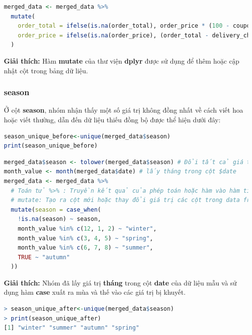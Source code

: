 \begin{lstlisting}[language=R, caption=Xử lý cột \textbf{order\_total} và \textbf{order\_price}]
merged_data <- merged_data %>%
  mutate(
    order_total = ifelse(is.na(order_total), order_price * (100 - coupon_discount) / 100 + delivery_charges, order_total),
    order_price = ifelse(is.na(order_price), (order_total - delivery_charges) * 100 / (100 - coupon_discount), order_price)
  )

\end{lstlisting}
\textbf{Giải thích:} Hàm \textbf{mutate} của thư viện \textbf{dplyr} được sử dụng để thêm hoặc cập nhật cột trong bảng dữ liệu.

\subsubsection{season}

Ở cột \textbf{season}, nhóm nhận thấy một số giá trị không đồng nhất về cách viết hoa hoặc viết thường, dẫn đến dữ liệu thiếu đồng bộ được thể hiện dưới đây:

\begin{lstlisting}[language=R, caption=Giá trị cột \textbf{season} ban đầu]
season_unique_before<-unique(merged_data$season)
print(season_unique_before)

\end{lstlisting}

\begin{lstlisting}[language=R, caption=Xử lý cột \textbf{season}]
merged_data$season <- tolower(merged_data$season) # Đổi tất cả giá trị mùa dạng viết thường
month_value <- month(merged_data$date) # lấy tháng trong cột $date
merged_data <- merged_data %>%
  # Toán tử %>% : Truyền kết quả của phép toán hoặc hàm vào hàm tiếp theo .
  # mutate: Tạo ra cột mới hoặc thay đổi giá trị các cột trong data frame
  mutate(season = case_when(
    !is.na(season) ~ season,
    month_value %in% c(12, 1, 2) ~ "winter",
    month_value %in% c(3, 4, 5) ~ "spring",
    month_value %in% c(6, 7, 8) ~ "summer",
    TRUE ~ "autumn"
  ))

\end{lstlisting}
\begin{boxH}
\textbf{Giải thích:} Nhóm đã lấy giá trị \textbf{tháng} trong cột \textbf{date} của dữ liệu mẫu và sử dụng hàm \textbf{case} xuất ra mùa và thế vào các giá trị bị khuyết. 
\end{boxH}
\begin{lstlisting}[language=R, caption=Dữ liệu cột \textbf{season} sau khi xử lý]
> season_unique_after<-unique(merged_data$season)
> print(season_unique_after)
[1] "winter" "summer" "autumn" "spring"
\end{lstlisting}

